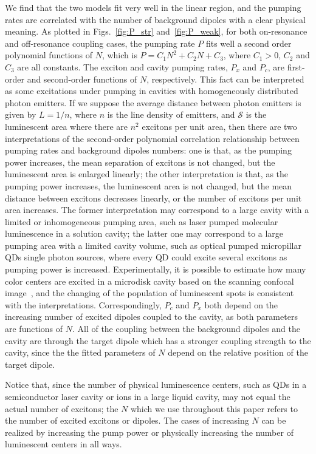 We find that the two models fit very well in the linear region, and the pumping rates are correlated with the number of background dipoles with a clear physical meaning. As plotted in Figs.~\ref{fig:P_str} and~\ref{fig:P_weak}, for both on-resonance and off-resonance coupling cases, the pumping rate $P$ fits well a second order polynomial functions of $N$, which is $P=C_1N^2+C_2N+C_3$, where $C_1>0$, $C_2$ and $C_3$ are all constants. The exciton and cavity pumping rates, $P_x$ and $P_c$, are first-order and second-order functions of $N$, respectively. This fact can be interpreted as some excitations under pumping in cavities with homogeneously distributed photon emitters. If we suppose the average distance between photon emitters is given by $L=1/n$, where $n$ is the line density of emitters, and $\mathcal{S}$ is the luminescent area where there are $n^2$ excitons per unit area, then there are two interpretations of the second-order polynomial correlation relationship between pumping rates and background dipoles numbers: one is that, as the pumping power increases, the mean separation of excitons is not changed, but the luminescent area is enlarged linearly; the other interpretation is that, as the pumping power increases, the luminescent area is not changed, but the mean distance between excitons decreases linearly, or the number of excitons per unit area increases. The former interpretation may correspond to a large cavity with a limited or inhomogeneous pumping area, such as laser pumped molecular luminescence in a solution cavity; the latter one may correspond to a large pumping area with a limited cavity volume, such as optical pumped micropillar QDs single photon sources, where every QD could excite several excitons as pumping power is increased. Experimentally, it is possible to estimate how many color centers are excited in a microdisk cavity based on the scanning confocal image~\cite{Santori2010}, and the changing of the population of luminescent spots is consistent with the interpretations. Correspondingly, $P_c$ and $P_x$ both depend on the increasing number of excited dipoles coupled to the cavity, as both parameters are functions of $N$. All of the coupling between the background dipoles and the cavity are through the target dipole which has a stronger coupling strength to the cavity, since the the fitted parameters of $N$ depend on the relative position of the target dipole.

Notice that, since the number of physical luminescence centers, such as QDs in a semiconductor laser cavity or ions in a large liquid cavity, may not equal the actual number of excitons; the $N$ which we use throughout this paper refers to the number of excited excitons or dipoles. The cases of increasing $N$ can be realized by increasing the pump power or physically increasing the number of luminescent centers in all ways.

